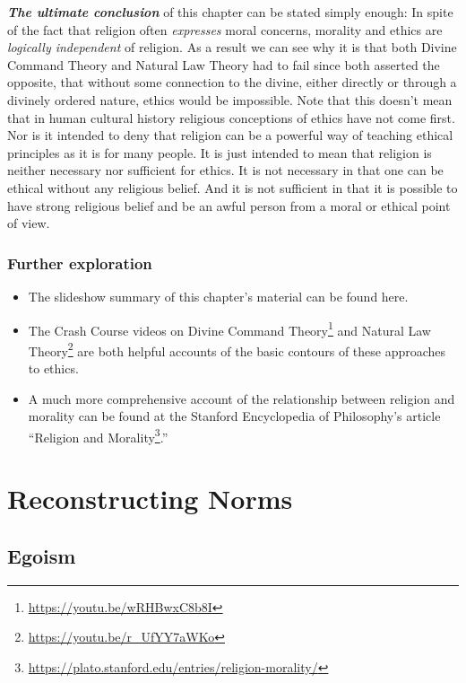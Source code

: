 \documentclass[12pt, openany]{book}
\renewcommand{\href}[2]{#2\footnote{\url{#1}}}
\begin{document}
\textbf{\emph{The ultimate conclusion}} of this chapter can be stated simply enough: In spite of the fact that religion often \emph{expresses} moral concerns, morality and ethics are \emph{logically independent} of religion. As a result we can see why it is that both Divine Command Theory and Natural Law Theory had to fail since both asserted the opposite, that without some connection to the divine, either directly or through a divinely ordered nature, ethics would be impossible. Note that this doesn't mean that in human cultural history religious conceptions of ethics have not come first. Nor is it intended to deny that religion can be a powerful way of teaching ethical principles as it is for many people. It is just intended to mean that religion is neither necessary nor sufficient for ethics. It is not necessary in that one can be ethical without any religious belief. And it is not sufficient in that it is possible to have strong religious belief and be an awful person from a moral or ethical point of view.

\hypertarget{further-exploration-3}{%
\section*{Further exploration}\label{further-exploration-3}}


\begin{itemize}
\item
  The slideshow summary of this chapter's material can be found here.
\item
  The Crash Course videos on \href{https://youtu.be/wRHBwxC8b8I}{Divine Command Theory} and \href{https://youtu.be/r_UfYY7aWKo}{Natural Law Theory} are both helpful accounts of the basic contours of these approaches to ethics.
\item
  A much more comprehensive account of the relationship between religion and morality can be found at the Stanford Encyclopedia of Philosophy's article ``\href{https://plato.stanford.edu/entries/religion-morality/}{Religion and Morality}.''
\end{itemize}

\hypertarget{part-reconstructing-norms}{%
\part{Reconstructing Norms}\label{part-reconstructing-norms}}

\hypertarget{egoism}{%
\chapter{Egoism}\label{egoism}}
\end{document}
